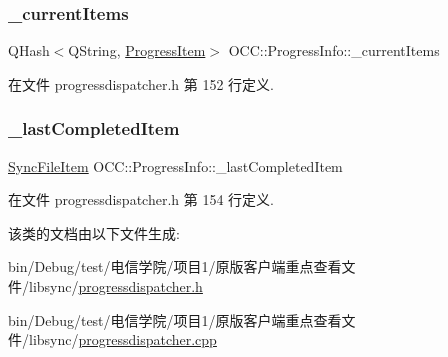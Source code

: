 \subsubsection{\texorpdfstring{\+\_\+current\+Items}{\_currentItems}}
{\footnotesize\ttfamily Q\+Hash$<$Q\+String, \hyperlink{struct_o_c_c_1_1_progress_info_1_1_progress_item}{Progress\+Item}$>$ O\+C\+C\+::\+Progress\+Info\+::\+\_\+current\+Items}



在文件 progressdispatcher.\+h 第 152 行定义.

\mbox{\label{class_o_c_c_1_1_progress_info_acdfbd2cc5003d743ab483413be80d24b}} 
\subsubsection{\texorpdfstring{\+\_\+last\+Completed\+Item}{\_lastCompletedItem}}
{\footnotesize\ttfamily \hyperlink{class_o_c_c_1_1_sync_file_item}{Sync\+File\+Item} O\+C\+C\+::\+Progress\+Info\+::\+\_\+last\+Completed\+Item}



在文件 progressdispatcher.\+h 第 154 行定义.



该类的文档由以下文件生成\+:\begin{DoxyCompactItemize}
\item 
bin/\+Debug/test/电信学院/项目1/原版客户端重点查看文件/libsync/\hyperlink{progressdispatcher_8h}{progressdispatcher.\+h}\item 
bin/\+Debug/test/电信学院/项目1/原版客户端重点查看文件/libsync/\hyperlink{progressdispatcher_8cpp}{progressdispatcher.\+cpp}\end{DoxyCompactItemize}
